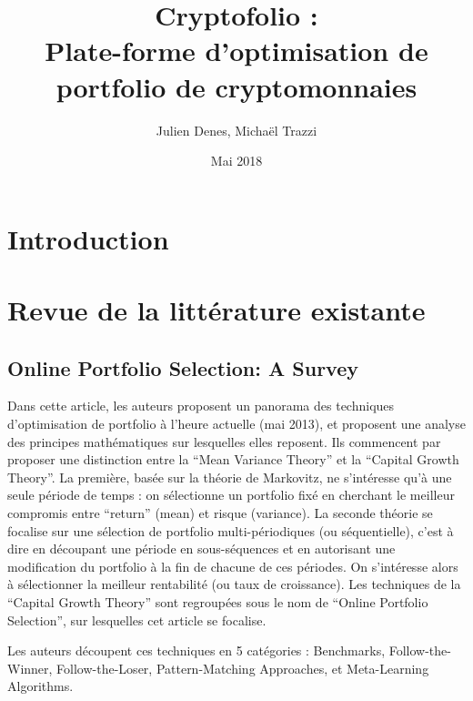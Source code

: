 \documentclass[a4paper]{article}
\title{Cryptofolio :\\Plate-forme d'optimisation de portfolio de cryptomonnaies}
\author{Julien Denes, Michaël Trazzi}
\date{Mai 2018}
\begin{document}
\maketitle

\section*{Introduction}


\section{Revue de la littérature existante}

\subsection{Online Portfolio Selection: A Survey}

Dans cette article, les auteurs proposent un panorama des techniques d'optimisation de portfolio à l'heure actuelle (mai 2013), et proposent une analyse des principes mathématiques sur lesquelles elles reposent. Ils commencent par proposer une distinction entre la ``Mean Variance Theory'' et la ``Capital Growth Theory''. La première, basée sur la théorie de Markovitz, ne s'intéresse qu'à une seule période de temps : on sélectionne un portfolio fixé en cherchant le meilleur compromis entre ``return'' (mean) et risque (variance). La seconde théorie se focalise sur une sélection de portfolio multi-périodiques (ou séquentielle), c'est à dire en découpant une période en sous-séquences et en autorisant une modification du portfolio à la fin de chacune de ces périodes. On s'intéresse alors à sélectionner la meilleur rentabilité (ou taux de croissance). Les techniques de la ``Capital Growth Theory'' sont regroupées sous le nom de ``Online Portfolio Selection'', sur lesquelles cet article se focalise.

Les auteurs découpent ces techniques en 5 catégories : Benchmarks, Follow-the-Winner, Follow-the-Loser, Pattern-Matching Approaches, et Meta-Learning Algorithms.
\end{document}
